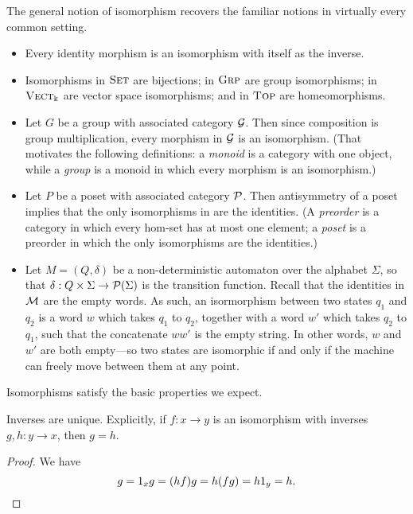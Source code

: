 \begin{ex} The general notion of isomorphism recovers the familiar notions in
  virtually every common setting.
  \begin{itemize}
    \item Every identity morphism is an isomorphism with itself as the inverse.
    \item Isomorphisms in ${\textsc{\text{Set}}}$ are bijections; in ${\textsc{\text{Grp}}}$ are group
      isomorphisms; in ${\textsc{\text{Vect}}}_\Bbbk$ are vector space isomorphisms; and in
      ${\textsc{\text{Top}}}$ are homeomorphisms.
    \item Let $G$ be a group with associated category $\mathcal{G}$. Then since
      composition is group multiplication, every morphism in $\mathcal{G}$ is an
      isomorphism. (That motivates the following definitions: a \emph{monoid} is a
      category with one object, while a \emph{group} is a monoid in which every
      morphism is an isomorphism.)
    \item Let $P$ be a poset with associated category $\mathcal{P}$. Then antisymmetry of
      a poset implies that the only isomorphisms in are the identities. (A
      \emph{preorder} is a category in which every hom-set has at most one
      element; a \emph{poset} is a preorder in which the only isomorphisms are
      the identities.)
    \item Let $M = (Q, \delta)$ be a non-deterministic automaton over the
      alphabet $\Sigma$, so that $\delta: Q\times \Sigma\to \mathcal{P}(\Sigma)$ is the
      transition function. Recall that the identities in $\mathcal{M}$ are the empty
      words. As such, an isormorphism between two states $q_1$ and $q_2$ is a
      word $w$ which takes $q_1$ to $q_2$, together with a word $w'$ which takes
      $q_2$ to $q_1$, such that the concatenate $ww'$ is the empty string. In
      other words, $w$ and $w'$ are both empty---so two states are isomorphic if
      and only if the machine can freely move between them at any point.
  \end{itemize}
\end{ex}

Isomorphisms satisfy the basic properties we expect.

\begin{prop}
  Inverses are unique. Explicitly, if $f: x\to y$ is an isomorphism with
  inverses $g, h: y\to x$, then $g = h$.
\end{prop}

\begin{proof}
  We have \[
    g = 1_xg = (hf)g = h(fg) = h1_y = h.\qedhere
  \]
\end{proof}

